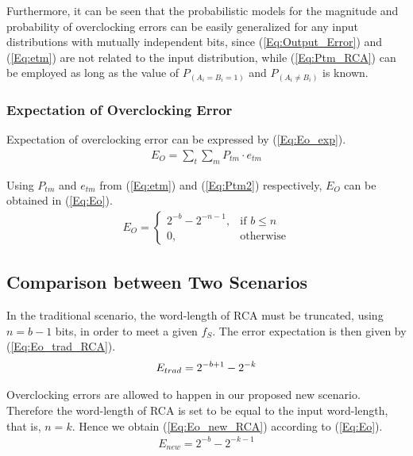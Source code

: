 \documentclass[prodmode,acmtrets]{acmsmall} %
\begin{document}
Furthermore, it can be seen that the probabilistic models for the magnitude and probability of overclocking errors can be easily generalized for any input distributions with mutually independent bits, since (\ref{Eq:Output_Error}) and (\ref{Eq:etm}) are not related to the input distribution, while (\ref{Eq:Ptm_RCA}) can be employed as long as the value of $P_{(A_i=B_i=1)}$ and $P_{(A_i\neq B_i)}$ is known.

\subsubsection{Expectation of Overclocking Error}
Expectation of overclocking error can be expressed by (\ref{Eq:Eo_exp}).
%
\begin{eqnarray}\label{Eq:Eo_exp}
    E_O=\sum_{t}\sum_{m}P_{tm}\cdot e_{tm}
\end{eqnarray}

Using $P_{tm}$ and $e_{tm}$ from (\ref{Eq:etm}) and (\ref{Eq:Ptm2}) respectively, $E_O$ can be obtained in (\ref{Eq:Eo}).
%
\begin{eqnarray}\label{Eq:Eo}
      E_O=\left\{
        \begin{matrix}
            2^{-b}-2^{-n-1}, & \textrm{if $b\leq n$}\\
            0, & \textrm{otherwise}
        \end{matrix}
      \right.
\end{eqnarray}

\subsection{Comparison between Two Scenarios}\label{section_RCA_Comparison}
In the traditional scenario, the word-length of RCA must be truncated, using $n=b-1$ bits, in order to meet a given $f_S$. The error expectation is then given by (\ref{Eq:Eo_trad_RCA}).
%
\begin{eqnarray}\label{Eq:Eo_trad_RCA}
  E_{trad}=2^{-b+1}-2^{-k}
  \vspace{-1ex}
\end{eqnarray}

Overclocking errors are allowed to happen in our proposed new scenario. Therefore the word-length of RCA is set to be equal to the input word-length, that is, $n=k$. Hence we obtain (\ref{Eq:Eo_new_RCA}) according to (\ref{Eq:Eo}).
%
\begin{eqnarray}\label{Eq:Eo_new_RCA}
  E_{new}=2^{-b}-2^{-k-1}
\end{eqnarray}
\end{document}
